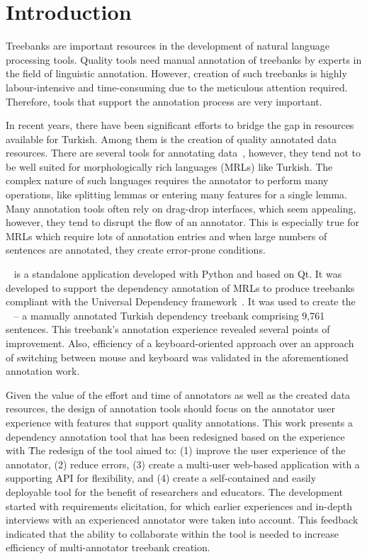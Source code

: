 \section{Introduction}
\label{sec:introduction}

Treebanks are important resources in the development of natural language processing tools.
Quality tools need manual annotation of treebanks by experts in the field of linguistic annotation.
However, creation of such treebanks is highly labour-intensive and time-consuming due to the meticulous attention required.
Therefore, tools that support the annotation process are very important.

In recent years, there have been significant efforts to bridge the gap in resources available for Turkish.
Among them is the creation of quality annotated data resources.
There are several tools for annotating data~\cite{UD}, however, they tend not to be well suited for morphologically rich languages (MRLs) like Turkish.
The complex nature of such languages requires the annotator to perform many operations, like splitting lemmas or entering many features for a single lemma.
Many annotation tools often rely on drag-drop interfaces, which seem appealing, however, they tend to disrupt the flow of an annotator.
This is especially true for MRLs which require lots of annotation entries and when large numbers of sentences are annotated, they create error-prone conditions. %

\boatvone~\cite{trk2020resources} is a standalone application developed with Python and based on Qt.
It was developed to support the dependency annotation of MRLs to produce treebanks compliant with the Universal Dependency framework~\cite{UD}.
It was used to create the \bountreebank~\cite{turk-etal-2019-turkish,trk2020resources,UD-Boun-Treebank} -- a manually annotated Turkish dependency treebank comprising 9,761 sentences.
This treebank's annotation experience revealed several points of improvement.
Also, efficiency of a keyboard-oriented approach over an approach of switching between mouse and keyboard was validated in the aforementioned annotation work.

Given the value of the effort and time of annotators as well as the created data resources, the design of annotation tools should focus on the annotator user experience with features that support quality annotations.
This work presents a dependency annotation tool that has been redesigned based on the experience with \boatvone\.
The redesign of the tool aimed to: (1) improve the user experience of the annotator, (2) reduce errors, (3) create a multi-user web-based application with a supporting API for flexibility, and (4) create a self-contained and easily deployable tool for the benefit of researchers and educators.
The development started with requirements elicitation, for which earlier experiences and in-depth interviews with an experienced annotator were taken into account.
This feedback indicated that the ability to collaborate within the tool is needed to increase efficiency of multi-annotator treebank creation.

